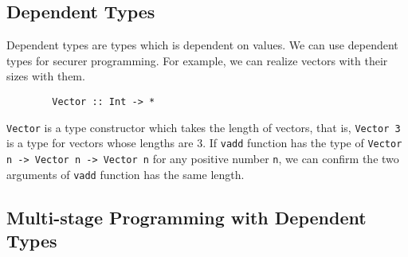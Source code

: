 
\subsection{Dependent Types}


Dependent types are types which is  dependent on values.
We can use dependent types for securer programming. 
For example, we can realize vectors with their sizes with them.
\begin{verbatim}
        Vector :: Int -> *
\end{verbatim}
\verb|Vector| is a type constructor which takes the length of vectors, that is, 
\verb|Vector 3| is a type for vectors whose lengths are 3.
If \verb|vadd| function has the type of \verb|Vector n -> Vector n -> Vector n| for any positive number \verb|n|,
we can confirm the two arguments of \verb|vadd| function has the same length.

\subsection{Multi-stage Programming with Dependent Types}

